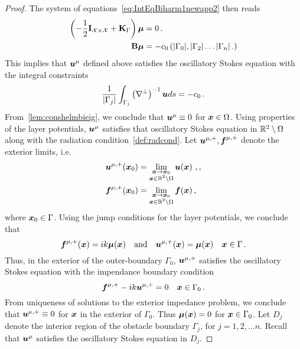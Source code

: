 \begin{proof}
The system of equations~\cref{eq:IntEqBiharm1newapp2} then reads
\begin{align}
\left(-\frac{1}{2}\mathbf{I}_{\mathcal{X}\times\mathcal{X}} 
+ \mathbf{K}_\Gamma \right) 
\boldsymbol{\mu} &= 0 \, . \label{eq:IntEq1} \\
\mathbf{B} {\boldsymbol \mu} &= -c_{0} \left(|\Gamma_{0}|, |\Gamma_{2}| \ldots |\Gamma_{n}| 
\,. 
\right)
\end{align}
This implies that ${\boldsymbol u}^{\mu}$ defined above satisfies the
oscillatory Stokes equation with the integral constraints
\begin{equation}
\frac{1}{|\Gamma_{j}|} 
\int_{\Gamma_{j}} \left(\nabla^{\perp}\right)^{-1} {\boldsymbol u} ds = -c_{0} 
\, .
\end{equation}
From~\cref{lem:conshelmbieig}, we conclude that ${\boldsymbol u}^{\mu} \equiv 0$ 
for ${\boldsymbol x} \in \Omega$.
Using properties of the layer potentials, ${\boldsymbol u}^{\mu}$ satisfies that
oscillatory Stokes equation in $\mathbb{R}^{2} \setminus \Omega$
along with the radiation condition~\cref{def:radcond}.
Let ${\boldsymbol u}^{\mu,+}, {\boldsymbol f}^{\mu,+}$ denote the exterior limits, i.e.
\begin{align}
{\boldsymbol u}^{\mu,+}({\boldsymbol x}_{0}) &=
\lim_{\substack{{\boldsymbol x} \to {\boldsymbol x}_{0}\\ {\boldsymbol x} \in \mathbb{R}^{2} \setminus \Omega}}
{\boldsymbol u}({\boldsymbol x})\ , , \\ 
{\boldsymbol f}^{\mu,+}({\boldsymbol x}_{0}) &=
\lim_{\substack{{\boldsymbol x} \to {\boldsymbol x}_{0}\\ {\boldsymbol x} \in \mathbb{R}^{2} \setminus \Omega}}
{\boldsymbol f}({\boldsymbol x}) \, , \\ 
\end{align}
where ${\boldsymbol x}_{0} \in \Gamma$.
Using the jump conditions for the layer potentials, we conclude that
\begin{equation}
{\boldsymbol f}^{\mu,+}({\boldsymbol x}) = ik {\boldsymbol \mu} ({\boldsymbol x}) \quad \text{and} \quad 
{\boldsymbol u}^{\mu,+}({\boldsymbol x}) = {\boldsymbol \mu}
({\boldsymbol x}) \quad {\boldsymbol x} \in \Gamma \,. 
\label{eq:bcaux}
\end{equation}
Thus, in the exterior of the outer-boundary $\Gamma_{0}$, 
${\boldsymbol u}^{\mu,+}$ satisfies the oscillatory Stokes equation with the impendance
boundary condition
\begin{equation}
{\boldsymbol f}^{\mu,+} -ik {\boldsymbol u}^{\mu,+} = 0 \quad {\boldsymbol x} \in \Gamma_{0} \, .
\end{equation}
From uniqueness of solutions to the exterior impedance problem, we
conclude that ${\boldsymbol u}^{\mu,+}\equiv 0$ for ${\boldsymbol x}$ in the exterior of 
$\Gamma_{0}$.
Thus ${\boldsymbol \mu}({\boldsymbol x}) = 0$ for ${\boldsymbol x} \in \Gamma_{0}$.
Let $D_{j}$ denote the interior region of the obstacle boundary
$\Gamma_{j}$, for $j=1,2,\ldots n$. 
Recall that ${\boldsymbol u}^{\mu}$ satisfies the oscillatory Stokes equation in $D_{j}$.

\end{proof}
